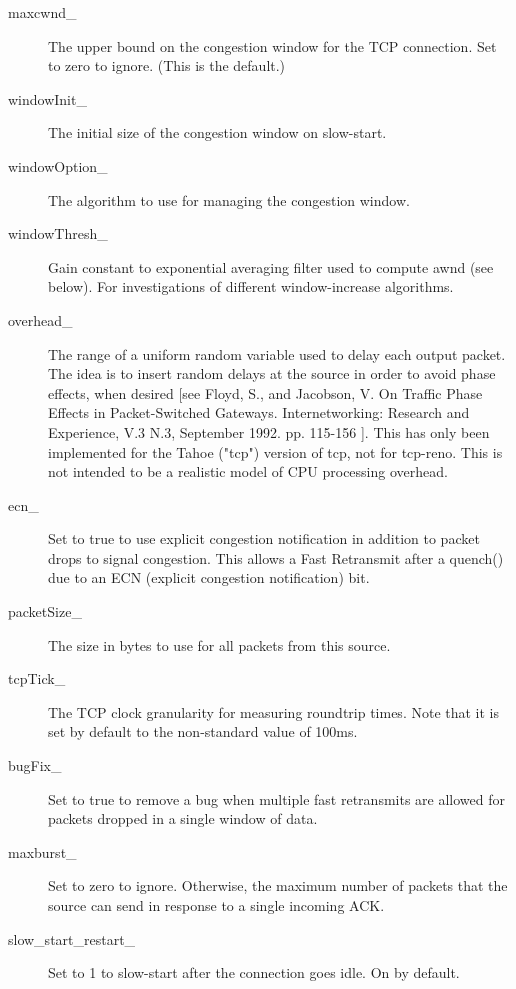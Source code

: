 \begin{description}
\begin{description}
\item[maxcwnd\_]
The upper bound on the congestion window for the TCP connection. Set to
zero to ignore. (This is the default.) 

\item[windowInit\_]
The initial size of the congestion window on slow-start. 

\item[windowOption\_]
The algorithm to use for managing the congestion window. 

\item[windowThresh\_]
Gain constant to exponential averaging filter used to compute awnd (see
below). For investigations of different window-increase algorithms. 

\item[overhead\_]
The range of a uniform random variable used to delay each output packet.
The idea is to insert random delays at the source in order to avoid phase
effects, when desired [see Floyd, S., and Jacobson, V. On Traffic Phase
Effects in Packet-Switched Gateways. Internetworking: Research and
Experience, V.3 N.3, September 1992. pp. 115-156 ]. This has only been
implemented for the Tahoe ("tcp") version of tcp, not for tcp-reno. This
is not intended to be a realistic model of CPU processing overhead. 

\item[ecn\_] Set to true to use explicit congestion notification in
addition to packet drops to signal congestion. This allows a Fast
Retransmit after a quench() due to an ECN (explicit congestion
notification) bit. 

\item[packetSize\_]
The size in bytes to use for all packets from this source. 

\item[tcpTick\_]
The TCP clock granularity for measuring roundtrip times. Note that it is
set by default to the non-standard value of 100ms. 

\item[bugFix\_]
Set to true to remove a bug when multiple fast retransmits are allowed for
packets dropped in a single window of data. 

\item[maxburst\_]
Set to zero to ignore. Otherwise, the maximum number of packets that the
source can send in response to a single incoming ACK. 

\item[slow\_start\_restart\_]
Set to 1 to slow-start after the connection goes idle. On by default. 
\end{description}


\end{description}
